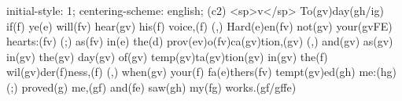 initial-style: 1;
centering-scheme: english;
(c2) <sp>v</sp> To(gv)day(gh/ig) if(f) ye(e) will(fv) hear(gv) his(f) voice,(f) (,) Hard(e)en(fv) not(gv) your(gvFE) hearts:(fv) (;) as(fv) in(e) the(d) prov(ev)o(fv)ca(gv)tion,(gv) (,) and(gv) as(gv) in(gv) the(gv) day(gv) of(gv) temp(gv)ta(gv)tion(gv) in(gv) the(f) wil(gv)der(f)ness,(f) (,) when(gv) your(f) fa(e)thers(fv) tempt(gv)ed(gh) me:(hg) (;) proved(g) me,(gf) and(fe) saw(gh) my(fg) works.(gf/gffe)
